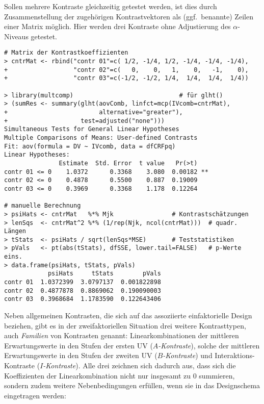 Sollen mehrere Kontraste gleichzeitig getestet werden, ist dies durch Zusammenstellung der zugehörigen Kontrastvektoren als (ggf.\ benannte) Zeilen einer Matrix möglich. Hier werden drei Kontraste ohne Adjustierung des $\alpha$-Niveaus getestet.
\begin{lstlisting}
# Matrix der Kontrastkoeffizienten
> cntrMat <- rbind("contr 01"=c( 1/2, -1/4, 1/2, -1/4, -1/4, -1/4),
+                  "contr 02"=c(   0,    0,   1,    0,   -1,    0),
+                  "contr 03"=c(-1/2, -1/2, 1/4,  1/4,  1/4,  1/4))

> library(multcomp)                             # für glht()
> (sumRes <- summary(glht(aovComb, linfct=mcp(IVcomb=cntrMat),
+                         alternative="greater"),
+                    test=adjusted("none")))
Simultaneous Tests for General Linear Hypotheses
Multiple Comparisons of Means: User-defined Contrasts
Fit: aov(formula = DV ~ IVcomb, data = dfCRFpq)
Linear Hypotheses:
               Estimate  Std. Error  t value   Pr(>t)
contr 01 <= 0    1.0372      0.3368    3.080  0.00182 **
contr 02 <= 0    0.4878      0.5500    0.887  0.19009
contr 03 <= 0    0.3969      0.3368    1.178  0.12264

# manuelle Berechnung
> psiHats <- cntrMat   %*% Mjk                # Kontrastschätzungen
> lenSqs  <- cntrMat^2 %*% (1/rep(Njk, ncol(cntrMat)))  # quadr. Längen
> tStats  <- psiHats / sqrt(lenSqs*MSE)       # Teststatistiken
> pVals   <- pt(abs(tStats), dfSSE, lower.tail=FALSE)   # p-Werte eins.
> data.frame(psiHats, tStats, pVals)
            psiHats     tStats        pVals
contr 01  1.0372399  3.0797137  0.001822898
contr 02  0.4877878  0.8869062  0.190090003
contr 03  0.3968684  1.1783590  0.122643406
\end{lstlisting}

Neben allgemeinen Kontrasten, die sich auf das assoziierte einfaktorielle Design beziehen, gibt es in der zweifaktoriellen Situation drei weitere Kontrasttypen, auch \emph{Familien} von Kontrasten genannt: Linearkombinationen der mittleren Erwartungswerte in den Stufen der ersten UV (\emph{$A$-Kontraste}), solche der mittleren Erwartungswerte in den Stufen der zweiten UV (\emph{$B$-Kontraste}) und Interaktions-Kontraste (\emph{$I$-Kontraste}). Alle drei zeichnen sich dadurch aus, dass sich die Koeffizienten der Linearkombination nicht nur insgesamt zu $0$ summieren, sondern zudem weitere Nebenbedingungen erfüllen, wenn sie in das Designschema eingetragen werden:

